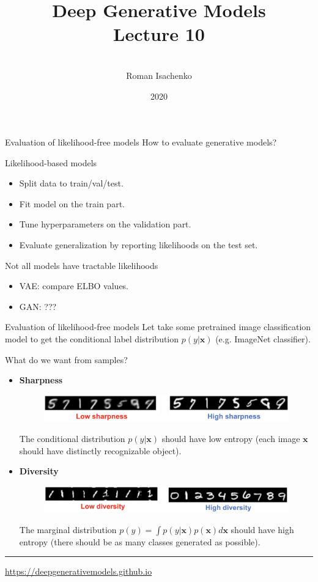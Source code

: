 \documentclass{beamer}
\title[\hbox to 56mm{Deep Generative Models  \hfill\insertframenumber\,/\,\inserttotalframenumber}]
{Deep Generative Models \\ Lecture 10}
\author[Roman Isachenko]{\\Roman Isachenko}
\institute[MIPT]{Moscow Institute of Physics and Technology \\
}
\date{2020}
\newcommand{\bx}{\mathbf{x}}
\begin{document}
\begin{frame}
\titlepage
\end{frame}
\begin{frame}{Evaluation of likelihood-free models}
	How to evaluate generative models?
	\begin{block}{Likelihood-based models}
		\begin{itemize}
			\item Split data to train/val/test.
			\item Fit model on the train part.
			\item Tune hyperparameters on the validation part.
			\item Evaluate generalization by reporting likelihoods on the test set.
		\end{itemize}
	\end{block}
	\begin{block}{Not all models have tractable likelihoods}
		\begin{itemize}
			\item VAE: compare ELBO values.
			\item GAN: ???
		\end{itemize}
	\end{block}
\end{frame}
\begin{frame}{Evaluation of likelihood-free models}
	Let take some pretrained image classification model to get the conditional label distribution $p(y | \bx)$ (e.g. ImageNet classifier).
	\begin{block}{What do we want from samples?}
		\begin{itemize}
			\item \textbf{Sharpness}
			\begin{figure}
				\centering
				\includegraphics[width=0.9\linewidth]{figs/sharpness}
			\end{figure}
			The conditional distribution $p(y | \bx)$ should have low entropy (each image $\bx$ should have distinctly recognizable object).
			\item \textbf{Diversity}
			\begin{figure}
				\centering
				\includegraphics[width=0.9\linewidth]{figs/diversity}
			\end{figure}
			The marginal distribution $p(y) = \int p(y | \bx) p(\bx) d \bx$ should have high entropy (there should be as many classes generated as possible).
		\end{itemize}
	\end{block}
	\vfill
	\hrule\medskip 
	{\scriptsize \href{https://deepgenerativemodels.github.io}{https://deepgenerativemodels.github.io}}
\end{frame}
\end{document}
